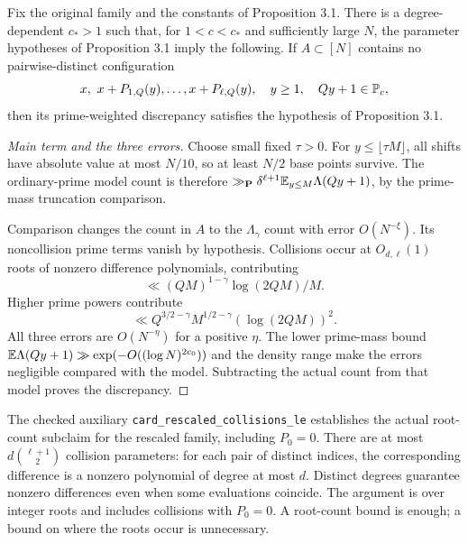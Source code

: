 \fi

\begin{lemma}\label{l:PS-discrepancy}
\leanok
Fix the original family and the constants of Proposition 3.1. There is a degree-dependent $c_*>1$ such that, for $1<c<c_*$ and sufficiently large $N$, the parameter hypotheses of Proposition 3.1 imply the following. If $A\subset[N]$ contains no pairwise-distinct configuration
\[
 x,\ x+P_{1,Q}(y),\ldots,x+P_{\ell,Q}(y),
 \quad y\geq1,\quad Qy+1\in\mathbb P_c,
\]
then its prime-weighted discrepancy satisfies the hypothesis of Proposition 3.1.
\end{lemma}
\begin{proof}[Main term and the three errors]
\leanok
Choose small fixed $\tau>0$. For $y\leq\lfloor\tau M\rfloor$, all shifts have absolute value at most $N/10$, so at least $N/2$ base points survive. The ordinary-prime model count is therefore $\gg_{\mathbf P}\delta^{\ell+1}\mathbb E_{y\leq M}\Lambda(Qy+1)$, by the prime-mass truncation comparison.

Comparison changes the count in $A$ to the $\Lambda_\gamma$ count with error $O(N^{-\xi})$. Its noncollision prime terms vanish by hypothesis. Collisions occur at $O_{d,\ell}(1)$ roots of nonzero difference polynomials, contributing
\[
 \ll (QM)^{1-\gamma}\log(2QM)/M.
\]
Higher prime powers contribute
\[
 \ll Q^{3/2-\gamma}M^{1/2-\gamma}(\log(2QM))^2.
\]
All three errors are $O(N^{-\eta})$ for a positive $\eta$. The lower prime-mass bound $\mathbb E\Lambda(Qy+1)\gg\exp(-O((\log N)^{2c_0}))$ and the density range make the errors negligible compared with the model. Subtracting the actual count from that model proves the discrepancy.
\end{proof}
\ifDetailed
The checked auxiliary \texttt{card\_\allowbreak{}rescaled\_\allowbreak{}collisions\_\allowbreak{}le} establishes the actual root-count subclaim for the rescaled family, including $P_0=0$. There are at most $d\binom{\ell+1}{2}$ collision parameters: for each pair of distinct indices, the corresponding difference is a nonzero polynomial of degree at most $d$. Distinct degrees guarantee nonzero differences even when some evaluations coincide. The argument is over integer roots and includes collisions with $P_0=0$. A root-count bound is enough; a bound on where the roots occur is unnecessary.

